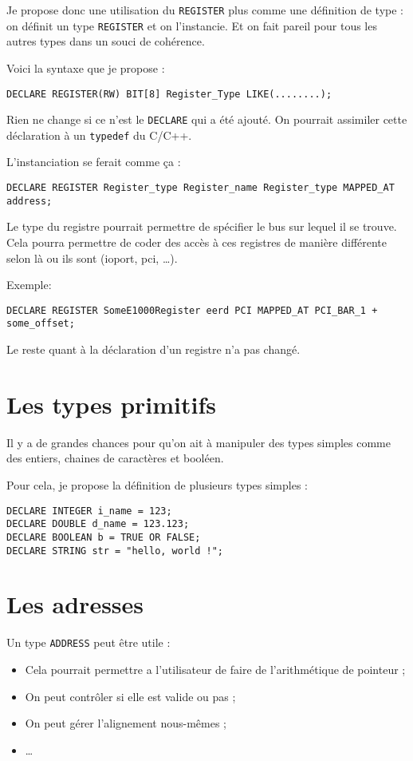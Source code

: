 \documentclass{rtxreport}
\begin{document}
Je propose donc une utilisation du \texttt{REGISTER} plus comme une définition de type : on définit un type \texttt{REGISTER} et on l’instancie. Et on fait pareil pour tous les autres types dans un souci de cohérence.

Voici la syntaxe que je propose :
\begin{lstlisting}
DECLARE REGISTER(RW) BIT[8] Register_Type LIKE(........);
\end{lstlisting}
Rien ne change si ce n’est le \texttt{DECLARE} qui a été ajouté. On pourrait assimiler cette déclaration à un \texttt{typedef} du C/C++.

L’instanciation se ferait comme ça :
\begin{lstlisting}
DECLARE REGISTER Register_type Register_name Register_type MAPPED_AT address;
\end{lstlisting}
Le type du registre pourrait permettre de spécifier le bus sur lequel il se trouve. Cela pourra permettre de coder des accès à ces registres de manière différente selon là ou ils sont (ioport, pci, \ldots).

Exemple:
\begin{lstlisting}
DECLARE REGISTER SomeE1000Register eerd PCI MAPPED_AT PCI_BAR_1 + some_offset;
\end{lstlisting}

Le reste quant à la déclaration d'un registre n'a pas changé.

\section{Les types primitifs}
Il y a de grandes chances pour qu’on ait à manipuler des types simples comme des entiers, chaines de caractères et booléen.

Pour cela, je propose la définition de plusieurs types simples :
\begin{lstlisting}
DECLARE INTEGER i_name = 123;
DECLARE DOUBLE d_name = 123.123;
DECLARE BOOLEAN b = TRUE OR FALSE;
DECLARE STRING str = "hello, world !";
\end{lstlisting}

\section{Les adresses}

Un type \texttt{ADDRESS} peut être utile : 
\begin{itemize}
	\item Cela pourrait permettre a l’utilisateur de faire de l’arithmétique de pointeur ; 
	\item On peut contrôler si elle est valide ou pas ;
	\item On peut gérer l’alignement nous-mêmes ; 
	\item \ldots
\end{itemize}
\end{document}
